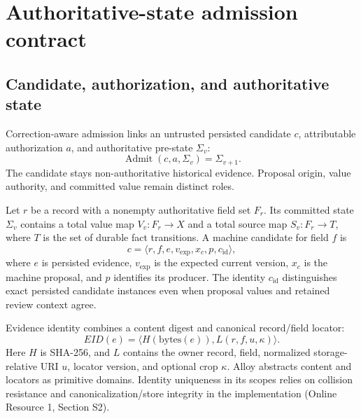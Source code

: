 \section{Authoritative-state admission contract}
\label{sec:contract}

\subsection{Candidate, authorization, and authoritative state}


Correction-aware admission links an untrusted persisted candidate $c$, attributable authorization $a$, and authoritative pre-state $\Sigma_v$:
\begin{equation}
\operatorname{Admit}(c,a,\Sigma_v)=\Sigma_{v+1}.
\label{eq:admit}
\end{equation}
The candidate stays non-authoritative historical evidence. Proposal origin, value authority, and committed value remain distinct roles.

Let $r$ be a record with a nonempty authoritative field set $F_r$. Its committed state $\Sigma_v$ contains a total value map $V_v:F_r\rightarrow X$ and a total source map $S_v:F_r\rightarrow T$, where $T$ is the set of durable fact transitions. A machine candidate for field $f$ is
\begin{equation}
c=\langle r,f,e,v_{\mathrm{exp}},x_c,p,c_{\mathrm{id}}\rangle,
\label{eq:candidate}
\end{equation}
where $e$ is persisted evidence, $v_{\mathrm{exp}}$ is the expected current version, $x_c$ is the machine proposal, and $p$ identifies its producer. The identity $c_{\mathrm{id}}$ distinguishes exact persisted candidate instances even when proposal values and retained review context agree.


Evidence identity combines a content digest and canonical record/field locator:
\begin{equation}
EID(e)=\langle H(\mathrm{bytes}(e)),L(r,f,u,\kappa)\rangle.
\label{eq:evidence}
\end{equation}
Here $H$ is SHA-256, and $L$ contains the owner record, field, normalized storage-relative URI $u$, locator version, and optional crop $\kappa$. Alloy abstracts content and locators as primitive domains. Identity uniqueness in its scopes relies on collision resistance and canonicalization/store integrity in the implementation (Online Resource 1, Section S2).

